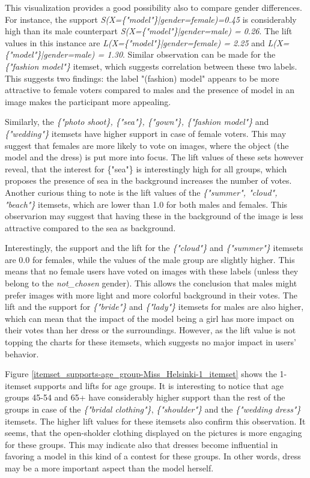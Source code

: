 This visualization provides a good possibility also to compare gender differences. For instance, the support \emph{S(X=\{"model"\}|gender=female)=0.45} is considerably high than its male counterpart \emph{S(X=\{"model"\}|gender=male) = 0.26}. The lift values in this instance are \emph{L(X=\{"model"\}|gender=female) = 2.25} and \emph{L(X=\{"model"\}|gender=male) = 1.30}. Similar observation can be made for the \emph{\{"fashion model"\}} itemset, which suggests correlation between these two labels. This suggests two findings: the label "(fashion) model" appears to be more attractive to female voters compared to males and the presence of model in an image makes the participant more appealing. 

Similarly, the \emph{\{"photo shoot\}, \{"sea"\}, \{"gown"\}, \{"fashion model"\}} and \emph{\{"wedding"\}} itemsets have higher support in case of female voters. This may suggest that females are more likely to vote on images, where the object (the model and the dress) is put more into focus. The lift values of these sets however reveal, that the interest for \{"sea"\} is interestingly high for all groups, which proposes the presence of sea in the background increases the number of votes. Another curious thing to note is the lift values of the \emph{\{"summer", "cloud", "beach"\}} itemsets, which are lower than 1.0 for both males and females. This observarion may suggest that having these in the background of the image is less attractive compared to the sea as background.

Interestingly, the support and the lift for the \emph{\{"cloud"\}} and \emph{\{"summer"\}} itemsets are 0.0 for females, while the values of the male group are slightly higher. This means that no female users have voted on images with these labels (unless they belong to the \emph{not\_chosen} gender). This allows the conclusion that males might prefer images with more light and more colorful background in their votes. The lift and the support for \emph{\{"bride"\}} and \emph{\{"lady"\}} itemsets for males are also higher, which can mean that the impact of the model being a girl has more impact on their votes than her dress or the surroundings. However, as the lift value is not topping the charts for these itemsets, which suggests no major impact in users' behavior.

Figure \ref{itemset_supports-age_group-Miss_Helsinki-1_itemset} shows the 1-itemset supports and lifts for age groups. It is interesting to notice that age groups 45-54 and 65+ have considerably higher support than the rest of the groups in case of the \emph{\{"bridal clothing"\}}, \emph{\{"shoulder"\}} and the \emph{\{"wedding dress"\}} itemsets. The higher lift values for these itemsets also confirm this observation. It seems, that the open-sholder clothing displayed on the pictures is more engaging for these groups. This may indicate also that dresses become influential in favoring a model in this kind of a contest for these groups. In other words, dress may be a more important aspect than the model herself.

